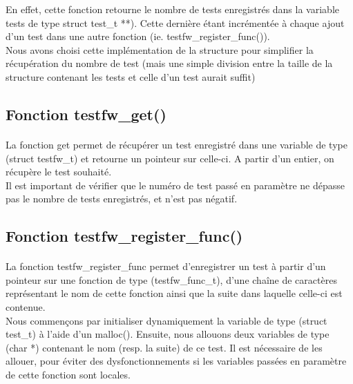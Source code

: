 \documentclass[12pt]{article}
\begin{document}
En effet, cette fonction retourne le nombre de tests enregistrés dans la variable tests de type struct  test\_t **). Cette dernière étant incrémentée à chaque ajout d'un test dans une autre fonction (ie. testfw\_register\_func()).\\

Nous avons choisi cette implémentation de la structure pour simplifier la récupération du nombre de test (mais une simple division entre la taille de la structure contenant les tests et celle d'un test aurait suffit)\\

\subsection{Fonction testfw\_get()}

\paragraph{}
La fonction get permet de récupérer un test enregistré dans une variable de type (struct testfw\_t) et retourne un pointeur sur celle-ci.  A partir d'un entier, on récupère le test souhaité.\\

Il est important de vérifier que le numéro de test passé en paramètre ne dépasse pas le nombre de tests enregistrés, et n'est pas négatif.

\subsection{Fonction testfw\_register\_func()}

\paragraph{}
La fonction testfw\_register\_func permet d'enregistrer un test à partir d'un pointeur sur une fonction de type (testfw\_func\_t), d'une chaîne de caractères représentant le nom de cette fonction ainsi que la suite dans laquelle celle-ci est contenue.\\

Nous commençons par initialiser dynamiquement la variable de type (struct test\_t) à l'aide d'un malloc().
Ensuite, nous allouons deux variables de type (char *) contenant le nom (resp. la suite) de ce test. Il est nécessaire de les allouer, pour éviter des dysfonctionnements si les variables passées en paramètre de cette fonction sont locales.\\
\end{document}
